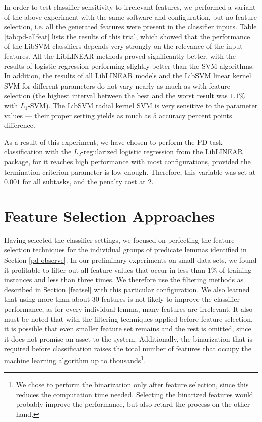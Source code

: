 \documentclass[12pt,notitlepage]{report}
\begin{document}
In order to test classifier sensitivity to irrelevant features, we performed a variant of the above experiment with the same software and configuration, but no feature selection, i.e. all the generated features were present in the classifier inputs. Table \ref{tab:pd-allfeat} lists the results of this trial, which showed that the performance of the LibSVM classifiers depends very strongly on the relevance of the input features. All the LibLINEAR methods proved significantly better, with the results of logistic regression performing slightly better than the SVM algorithms. In addition, the results of all LibLINEAR models and the LibSVM linear kernel SVM for different parameters do not vary nearly as much as with feature selection (the highest interval between the best and the worst result was $1.1\%$ with $L_1$-SVM). The LibSVM radial kernel SVM is very sensitive to the parameter values --- their proper setting yields as much as $5$ accuracy percent points difference. 

As a result of this experiment, we have chosen to perform the PD task classification with the $L_2$-regularized logistic regression from the LibLINEAR package, for it reaches high performance with most configurations, provided the termination criterion parameter is low enough. Therefore, this variable was set at $0.001$ for all subtasks, and the penalty cost at $2$.

\section{Feature Selection Approaches}\label{pd-training}

Having selected the classifier settings, we focused on perfecting the feature selection techniques for the individual groups of predicate lemmas identified in Section \ref{pd-observe}. In our preliminary experiments on small data sets, we found it profitable to filter out all feature values that occur in less than 1\% of training instances and less than three times. We therefore use the filtering methods as described in Section \ref{featsel} with this particular configuration. We also learned that using more than about 30 features is not likely to improve the classifier performance, as for every individual lemma, many features are irrelevant. It also must be noted that with the filtering techniques applied before feature selection, it is possible that even smaller feature set remains and the rest is omitted, since it does not promise an asset to the system. Additionally, the binarization that is required before classification raises the total number of features that occupy the machine learning algorithm up to thousands\footnote{We chose to perform the binarization only after feature selection, since this reduces the computation time needed. Selecting the binarized features would probably improve the performance, but also retard the process on the other hand.}.
\end{document}
